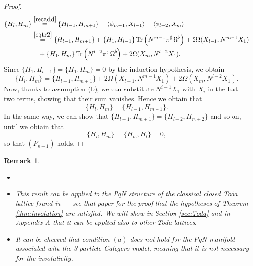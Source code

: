 \documentclass[12pt]{article}
\newtheorem{remark}[theorem]{Remark}
\newenvironment{rem}{\begin{remark} \rm}{\end{remark}}
\def\parpo#1#2{\{#1,#2\}}
\newcommand{\brke}[2]{{{\langle #1,#2\rangle}}}
\def\Tr{\operatorname{Tr}}
\begin{document}
\begin{proof}
\begin{equation}
\label{recadd2}
\begin{split}
\parpo{H_l}{H_m}&\stackrel{\eqref{recadd}}{=}\parpo{H_{l-1}}{H_{m+1}}-\brke{ \phi_{m-1}}{X_{l-1}}-\brke{\phi_{l-2}}{X_m}\\
&\stackrel{\eqref{eqtr2}}{=}\parpo{H_{l-1}}{H_{m+1}}+\parpo{H_1}{H_{l-1}}\Tr\left({N}^{m-1}\pi^\sharp\,\Omega^\flat\right)+2\Omega(X_{l-1},{N}^{m-1} X_1)\\
&\ \ \ +\parpo{H_1}{H_m}\Tr\left({N}^{l-2}\pi^\sharp\,\Omega^\flat\right)+2\Omega(X_m,{N}^{l-2} X_1).
\end{split}
\end{equation}
Since $\parpo{H_1}{H_{l-1}}=\parpo{H_1}{H_m}=0$ by the induction hypothesis, we obtain
\begin{equation}
\label{recadd3}
\parpo{H_l}{H_m}%
=\parpo{H_{l-1}}{H_{m+1}}+2\Omega(X_{l-1},{N}^{m-1} X_1)+2\Omega(X_m,{N}^{l-2} X_1).
\end{equation}
Now, thanks to assumption (b), we can substitute ${N}^{i-1}X_1$ with $X_{i}$ in the 
last two terms, showing that their sum vanishes. Hence we obtain that 
\begin{equation}
\label{recadd4}
\parpo{H_l}{H_m}=\parpo{H_{l-1}}{H_{m+1}}.
\end{equation}
In the same way, we can show that $\parpo{H_{l-1}}{H_{m+1}}=\parpo{H_{l-2}}{H_{m+2}}$ and so on, until we obtain that 
\begin{equation}
\label{recadd5}
\parpo{H_l}{H_m}=\parpo{H_{m}}{H_{l}}=0,
\end{equation}
so that $(P_{n+1})$ holds.
\end{proof}  %
\begin{rem}
\begin{itemize} 
\item[]
\item This result can be applied to the PqN structure of the classical closed Toda lattice found in \cite{FMOP2020} --- see that paper for the proof that the hypotheses of Theorem \ref{thm:involution} are satisfied. We will show in Section \ref{sec:Toda} and in Appendix A that it can be applied also to other Toda lattices.
\item It can be checked that condition $(a)$ does not hold for the %
PqN manifold associated with the 3-particle Calogero model, meaning that it is not necessary for the involutivity.
\end{itemize} 
\end{rem}
\end{document}
